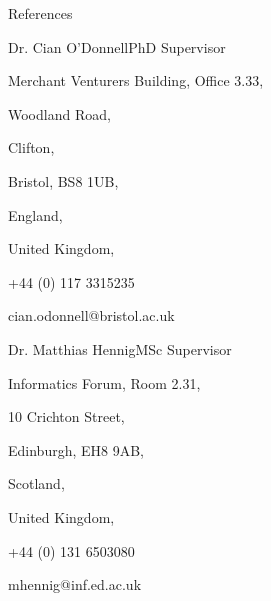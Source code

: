 \documentclass{resume} %
\begin{document}
\begin{rSection}{References}
    \begin{rSubsection}{Dr. Cian O'Donnell}{PhD Supervisor}{}{}
        \item Merchant Venturers Building, Office 3.33,
        \item Woodland Road,
        \item Clifton,
        \item Bristol, BS8 1UB,
        \item England,
        \item United Kingdom,
        \item +44 (0) 117 3315235
        \item cian.odonnell@bristol.ac.uk
    \end{rSubsection}

    \begin{rSubsection}{Dr. Matthias Hennig}{MSc Supervisor}{}{}
        \item Informatics Forum, Room 2.31, 
        \item 10 Crichton Street,
        \item Edinburgh, EH8 9AB,
        \item Scotland,
        \item United Kingdom,
        \item +44 (0) 131 6503080
        \item mhennig@inf.ed.ac.uk
    \end{rSubsection}
    
\end{rSection}
\end{document}
